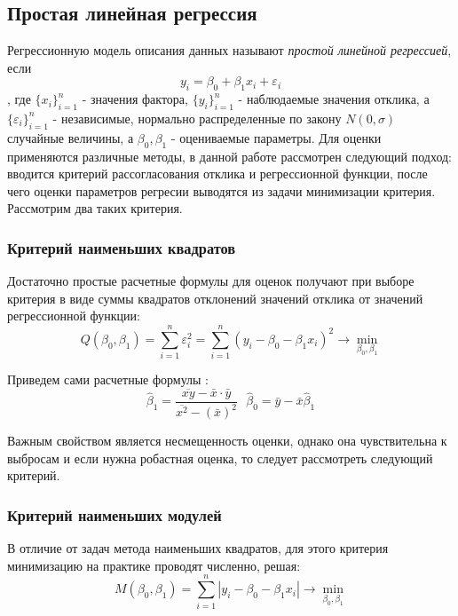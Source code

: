 \documentclass[12pt,a4paper]{article}
\begin{document}
\subsection{Простая линейная регрессия}
Регрессионную модель описания данных называют \textit{простой линейной регрессией}, если
\begin{equation}
	y_i = \beta_0 + \beta_1 x_i + \varepsilon_i
\end{equation}
, где $\{x_i\}_{i=1}^n$ - значения фактора, $\{y_i\}_{i=1}^n$ - наблюдаемые значения отклика, а $\{\varepsilon_i\}_{i=1}^n$ - независимые, нормально распределенные по закону $N(0, \sigma)$ случайные величины, а $\beta_0, \beta_1$ - оцениваемые параметры\cite[стр. 507]{verrazdely}. Для оценки применяются различные методы, в данной работе рассмотрен следующий подход: вводится критерий рассогласования отклика и регрессионной функции, после чего оценки параметров регресии выводятся из задачи минимизации критерия. Рассмотрим два таких критерия.

\subsubsection{Критерий наименьших квадратов}
Достаточно простые расчетные формулы для оценок получают при выборе критерия в виде суммы квадратов отклонений значений отклика от значений регрессионной функции:
\begin{equation}\label{lab6:1}
	Q\left(\beta_{0}, \beta_{1}\right)=\sum_{i=1}^{n} \varepsilon_i^{2}=\sum_{i=1}^{n}\left(y_{i}-\beta_{0}-\beta_{1} x_{i}\right)^{2} \rightarrow \min _{\beta_{0}, \beta_{1}}
\end{equation}

Приведем сами расчетные формулы \cite[стр. 509]{verrazdely}:
\begin{equation}
	\widehat{\beta}_{1}=\frac{\overline{x y} - \bar{x} \cdot \bar{y}}{\overline{x^2} - (\bar{x})^{2}} \ \ \ \widehat{\beta}_{0}=\bar{y} - \bar{x} \widehat{\beta}_{1}
\end{equation}

Важным свойством является несмещенность оценки, однако она чувствительна к выбросам и если нужна робастная оценка, то следует рассмотреть следующий критерий.

\subsubsection{Критерий наименьших модулей}
В отличие от задач метода наименьших квадратов, для этого критерия минимизацию на практике проводят численно, решая:
\begin{equation}\label{lab6:2}
	M\left(\beta_{0}, \beta_{1}\right)=\sum_{i=1}^{n}\left|y_{i}-\beta_{0}-\beta_{1} x_{i}\right| \rightarrow \min _{\beta_{0}, \beta_{1}}
\end{equation}
\end{document}
